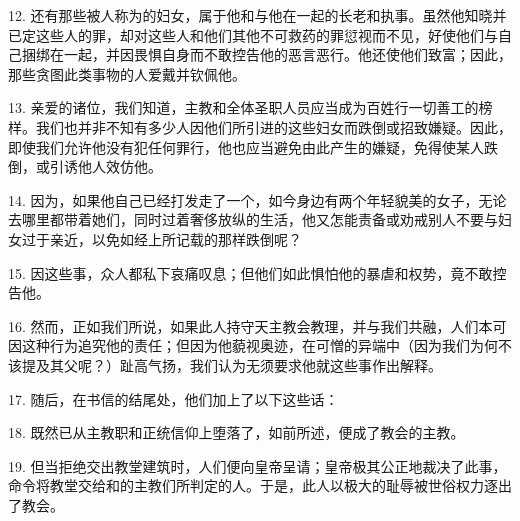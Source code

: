 12. 还有那些被人称为的妇女，属于他和与他在一起的长老和执事。虽然他知晓并已定这些人的罪，却对这些人和他们其他不可救药的罪愆视而不见，好使他们与自己捆绑在一起，并因畏惧自身而不敢控告他的恶言恶行。他还使他们致富；因此，那些贪图此类事物的人爱戴并钦佩他。\par

13. 亲爱的诸位，我们知道，主教和全体圣职人员应当成为百姓行一切善工的榜样。我们也并非不知有多少人因他们所引进的这些妇女而跌倒或招致嫌疑。因此，即使我们允许他没有犯任何罪行，他也应当避免由此产生的嫌疑，免得使某人跌倒，或引诱他人效仿他。\par

14. 因为，如果他自己已经打发走了一个，如今身边有两个年轻貌美的女子，无论去哪里都带着她们，同时过着奢侈放纵的生活，他又怎能责备或劝戒别人不要与妇女过于亲近，以免如经上所记载的那样跌倒呢？\par

15. 因这些事，众人都私下哀痛叹息；但他们如此惧怕他的暴虐和权势，竟不敢控告他。\par

16. 然而，正如我们所说，如果此人持守天主教会教理，并与我们共融，人们本可因这种行为追究他的责任；但因为他藐视奥迹，在可憎的异端中（因为我们为何不该提及其父呢？）趾高气扬，我们认为无须要求他就这些事作出解释。\par

17. 随后，在书信的结尾处，他们加上了以下这些话：\par

\par

18. 既然已从主教职和正统信仰上堕落了，如前所述，便成了教会的主教。\par

19. 但当拒绝交出教堂建筑时，人们便向皇帝呈请；皇帝极其公正地裁决了此事，命令将教堂交给和的主教们所判定的人。于是，此人以极大的耻辱被世俗权力逐出了教会。\par

